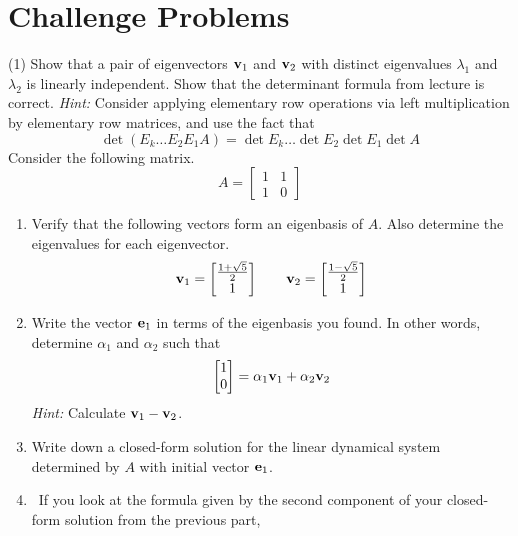 \section{Challenge Problems}

\begin{tasks}[resume, style=enumerate](1)
\task
  Show that a pair of eigenvectors $\mathbf v_1$ and $\mathbf v_2$ with
  distinct eigenvalues $\lambda_1$ and $\lambda_2$ is linearly
  independent.
\task
  Show that the determinant formula from lecture is correct.
  \textit{Hint:} Consider applying elementary row operations via left
  multiplication by elementary row matrices, and use the fact that
  \begin{displaymath}
    \det (E_k \ldots E_2 E_1 A) = \det E_k \ldots \det E_2 \det E_1 \det A
  \end{displaymath}
\task
  Consider the following matrix.
  \begin{displaymath}
    A =
    \begin{bmatrix}
      1 & 1 \\
      1 & 0
    \end{bmatrix}
  \end{displaymath}
  \begin{enumerate}[label=(\alph*)]
  \item
    Verify that the following vectors form an eigenbasis of $A$.  Also
    determine the eigenvalues for each eigenvector.
    \begin{displaymath}
      \mathbf v_1 =  \begin{bmatrix} \frac{1 + \sqrt{5}}{2} \\ 1 \end{bmatrix} 
      \qquad
      \mathbf v_2 =  \begin{bmatrix} \frac{1 - \sqrt{5}}{2} \\ 1 \end{bmatrix} 
    \end{displaymath}
  \item
    Write the vector $\mathbf e_1$ in terms of the eigenbasis you found.  In
    other words, determine $\alpha_1$ and $\alpha_2$ such that
    \begin{displaymath}
      \begin{bmatrix}
        1 \\ 0
      \end{bmatrix}
      =
      \alpha_1\mathbf v_1 + \alpha_2 \mathbf v_2
    \end{displaymath}
    \textit{Hint:} Calculate $\mathbf v_1 - \mathbf v_2$.
  \item
    Write down a closed-form solution for the linear dynamical system
    determined by $A$ with initial vector $\mathbf e_1$.
  \item
    \faCalculator \ If you look at the formula given by the second
    component of your closed-form solution from the previous part,

\end{enumerate}
\end{tasks}
